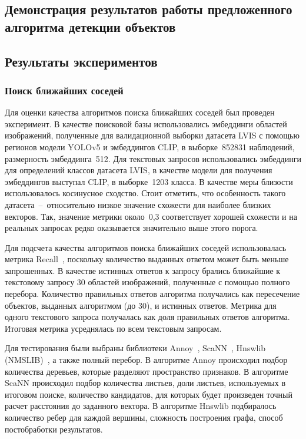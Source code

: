\documentclass[a4paper,14pt]{article}
\begin{document}
    \subsection{Демонстрация результатов работы предложенного алгоритма детекции объектов}


    \subsection{Результаты экспериментов}

    \subsubsection{Поиск ближайших соседей}

    Для оценки качества алгоритмов поиска ближайших соседей был проведен эксперимент.
    В качестве поисковой базы использовались эмбеддинги областей изображений, полученные для валидационной выборки датасета LVIS с помощью регионов модели YOLOv5 и эмбеддингов CLIP, в выборке~852831 наблюдений, размерность эмбеддинга~512.
    Для текстовых запросов использовались эмбеддинги для определений классов датасета LVIS, в качестве модели для получения эмбеддингов выступал CLIP, в выборке~1203 класса.
    В качестве меры близости использовалось косинусное сходство.
    Стоит отметить, что особенность такого датасета~--~относительно низкое значение схожести для наиболее близких векторов.
    Так, значение метрики около~0,3 соответствует хорошей схожести и на реальных запросах редко оказывается значительно выше этого порога.

    Для подсчета качества алгоритмов поиска ближайших соседей использовалась метрика Recall~\cite{aumuller2020ann}, поскольку количество выданных ответом может быть меньше запрошенных.
    В качестве истинных ответов к запросу брались ближайшие к текстовому запросу 30 областей изображений, полученные с помощью полного перебора.
    Количество правильных ответов алгоритма получались как пересечение объектов, выданных алгоритмом (до 30), и истинных ответов.
    Метрика для одного текстового запроса получалась как доля правильных ответов алгоритма.
    Итоговая метрика усреднялась по всем текстовым запросам.

    Для тестирования были выбраны библиотеки Annoy~\cite{annoy}, ScaNN~\cite{avq_2020}, Hnswlib (NMSLIB)~\cite{malkov2018efficient}, а также полный перебор.
    В алгоритме Annoy происходил подбор количества деревьев, которые разделяют пространство признаков.
    В алгоритме ScaNN происходил подбор количества листьев, доли листьев, используемых в итоговом поиске, количество кандидатов, для которых будет произведен точный расчет расстояния до заданного вектора.
    В алгоритме Hnswlib подбиралось количество ребер для каждой вершины, сложность построения графа, способ постобработки результатов.
\end{document}

